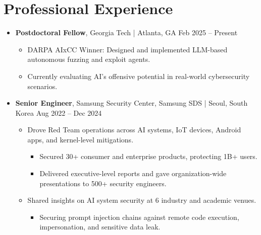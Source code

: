 \documentclass[11pt,letterpaper]{article}
\newcommand{\jobtitle}[1]{\textbf{#1}}
\newcommand{\location}[1]{\textcolor{secondary}{\small #1}}
\newcommand{\daterange}[1]{\textcolor{secondary}{\small #1}}
\begin{document}
\section{Professional Experience}
\begin{itemize}
\item \jobtitle{Postdoctoral Fellow}, \location{Georgia Tech | Atlanta, GA} \hfill \daterange{Feb 2025 -- Present}
    \begin{itemize}[] %
    \item DARPA AIxCC Winner: Designed and implemented LLM-based autonomous fuzzing and exploit agents.
    \item Currently evaluating AI's offensive potential in real-world cybersecurity scenarios.
    \end{itemize}

\item \jobtitle{Senior Engineer}, \location{Samsung Security Center, Samsung SDS | Seoul, South Korea} \hfill \daterange{Aug 2022 -- Dec 2024}
    \begin{itemize}[] %
    \item Drove Red Team operations across AI systems, IoT devices, Android apps, and kernel-level mitigations.
        \begin{itemize}[] %
        \item Secured 30+ consumer and enterprise products, protecting 1B+ users.
        \item Delivered executive-level reports and gave organization-wide presentations to 500+ security engineers.
        \end{itemize}
    \item Shared insights on AI system security at 6 industry and academic venues.
        \begin{itemize}[]
        \item Securing prompt injection chains against remote code execution, impersonation, and sensitive data leak.
        \end{itemize}
    \end{itemize}


\end{itemize}
\end{document}
